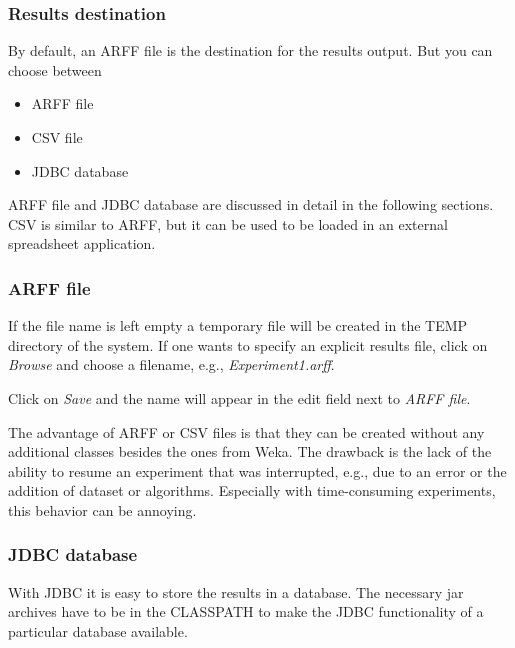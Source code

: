 \documentclass[a4paper]{article}
\begin{document}
\subsubsection{Results destination}

By default, an ARFF file is the destination for the results output. But you can choose between

\begin{itemize}
	\item ARFF file
   \item CSV file
   \item JDBC database 
\end{itemize}

ARFF file and JDBC database are discussed in detail in the following sections. CSV is similar to ARFF, but it can be used to be loaded in an external spreadsheet application.


\subsubsection*{ARFF file}

If the file name is left empty a temporary file will be created in the TEMP directory of the system. If one wants to specify an explicit results file, click on \textit{Browse} and choose a filename, e.g., \textit{Experiment1.arff}.

\begin{center}
\end{center}


Click on \textit{Save} and the name will appear in the edit field next to \textit{ARFF file}.

\begin{center}
\end{center}


The advantage of ARFF or CSV files is that they can be created without any additional classes besides the ones from Weka. The drawback is the lack of the ability to resume an experiment that was interrupted, e.g., due to an error or the addition of dataset or algorithms. Especially with time-consuming experiments, this behavior can be annoying.


\subsubsection*{JDBC database}

With JDBC it is easy to store the results in a database. The necessary jar archives have to be in the CLASSPATH to make the JDBC functionality of a particular database available.
\end{document}
